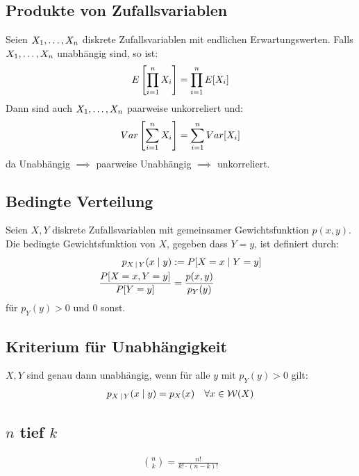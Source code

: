 \subsection*{Produkte von Zufallsvariablen}
Seien $X_1, \dots, X_n$ diskrete Zufallsvariablen mit endlichen
Erwartungswerten. Falls $X_1, \dots, X_n$ unabhängig sind, so ist:
\begin{align*}
  E \left[ \prod_{i = 1}^n X_i \right] = \prod_{i = 1}^n E[X_i]
\end{align*}
Dann sind auch $X_1, \dots, X_n$ paarweise unkorreliert und:
\begin{align*}
  Var \left[ \sum_{i = 1}^n X_i \right] = \sum_{i = 1}^n Var[X_i]
\end{align*}
da Unabhängig $\implies$ paarweise Unabhängig $\implies$ unkorreliert.
\subsection*{Bedingte Verteilung}
Seien $X, Y$ diskrete Zufallsvariablen mit gemeinsamer Gewichtsfunktion $p (x,
  y)$. Die bedingte Gewichtsfunktion von $X$, gegeben dass $Y = y$, ist definiert
durch:
\begin{align*}
  p_{X \, | \, Y} (x \; | \; y)    & := P[X = x \; | \; Y = y]     \\
  \frac{P[X = x, Y = y]}{P[Y = y]} & = \frac{p (x, y)}{p_Y (y)}
\end{align*}
für $p_Y (y) > 0$ und $0$ sonst.
\subsection*{Kriterium für Unabhängigkeit}
$X, Y$ sind genau dann unabhängig, wenn für alle $y$ mit $p_Y (y) > 0$
gilt:
\begin{align*}
  p_{X\,|\,Y} (x \; | \; y) = p_X (x) &  & \forall x \in \mathcal{W} (X)
\end{align*}
\subsection*{$n$ tief $k$}
\begin{align*}
  \binom{n}{k} = \frac{n!}{k! \cdot  (n - k)!}
\end{align*}
